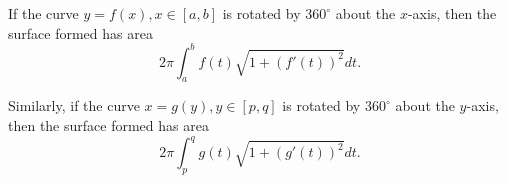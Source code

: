 If the curve $y=f(x), x \in [a,b]$ is rotated by $360^{\circ}$ about the $x$-axis, then the surface formed has area
\[ 2 \pi \int_a^b f(t) \sqrt {1
+ \left (f'(t)\right ) ^2 } dt . \]
\par
Similarly, if the curve $x=g(y), y \in [p,q]$ is rotated by $360^{\circ}$ about the $y$-axis, then the surface formed has area 
\[ 2 \pi \int_p^q g(t) \sqrt  {1 
+ \left ( g'(t) \right ) ^2} dt . \]
  
  
  
  
  
  
  